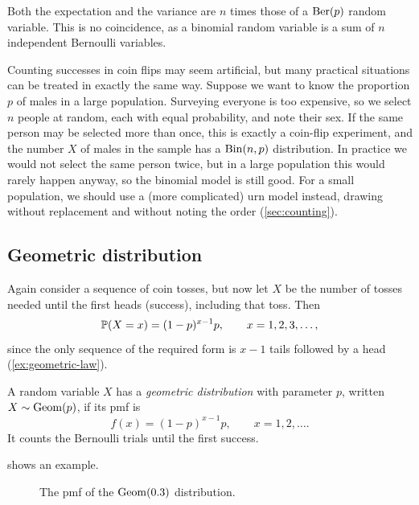 Both the expectation and the variance are $n$ times those of a $\mathrm{Ber}(p)$ random variable. This is no coincidence, as a binomial random variable is a sum of $n$ independent Bernoulli variables.

\begin{remark}\label{rem:binomial-sampling}
Counting successes in coin flips may seem artificial, but many practical situations can be treated in exactly the same way. Suppose we want to know the proportion $p$ of males in a large population. Surveying everyone is too expensive, so we select $n$ people at random, each with equal probability, and note their sex. If the same person may be selected more than once, this is exactly a coin-flip experiment, and the number $X$ of males in the sample has a $\mathrm{Bin}(n, p)$ distribution. In practice we would not select the same person twice, but in a large population this would rarely happen anyway, so the binomial model is still good. For a small population, we should use a (more complicated) urn model instead, drawing without replacement and without noting the order (\cref{sec:counting}).
\end{remark}

\subsection{Geometric distribution}\label{sec:geometric}

Again consider a sequence of coin tosses, but now let $X$ be the number of tosses needed until the first heads (success), including that toss. Then
\[
  \mathbb{P}(X = x) = (1 - p)^{x-1} p, \qquad x = 1, 2, 3, \ldots,
\]
since the only sequence of the required form is $x - 1$ tails followed by a head (\cref{ex:geometric-law}).

\begin{definition}\label{def:geometric}
A random variable $X$ has a \emph{geometric distribution} with parameter $p$, written $X \sim \mathrm{Geom}(p)$, if its pmf is
\[
  f(x) = (1-p)^{x-1} p, \qquad x = 1, 2, \ldots.
\]
It counts the Bernoulli trials until the first success.
\end{definition}

 shows an example.

\begin{figure}[H]
\centering
{}
\caption{The pmf of the $\mathrm{Geom}(0.3)$ distribution.}
\label{fig:geometric-pmf}
\end{figure}


